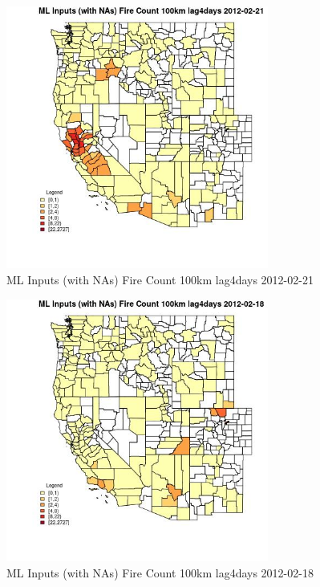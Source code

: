 \begin{figure} 
\centering  
\includegraphics[width=0.77\textwidth]{Code_Outputs/Report_ML_input_PM25_Step4_part_f_de_duplicated_aveswNAs_CountyFire_Count_100km_lag4daysMean2012-02-21.jpg} 
\caption{\label{fig:Report_ML_input_PM25_Step4_part_f_de_duplicated_aveswNAsCountyFire_Count_100km_lag4daysMean2012-02-21}ML Inputs (with NAs) Fire Count 100km lag4days 2012-02-21} 
\end{figure} 
 

\clearpage 

\begin{figure} 
\centering  
\includegraphics[width=0.77\textwidth]{Code_Outputs/Report_ML_input_PM25_Step4_part_f_de_duplicated_aveswNAs_CountyFire_Count_100km_lag4daysMean2012-02-18.jpg} 
\caption{\label{fig:Report_ML_input_PM25_Step4_part_f_de_duplicated_aveswNAsCountyFire_Count_100km_lag4daysMean2012-02-18}ML Inputs (with NAs) Fire Count 100km lag4days 2012-02-18} 
\end{figure} 
 

